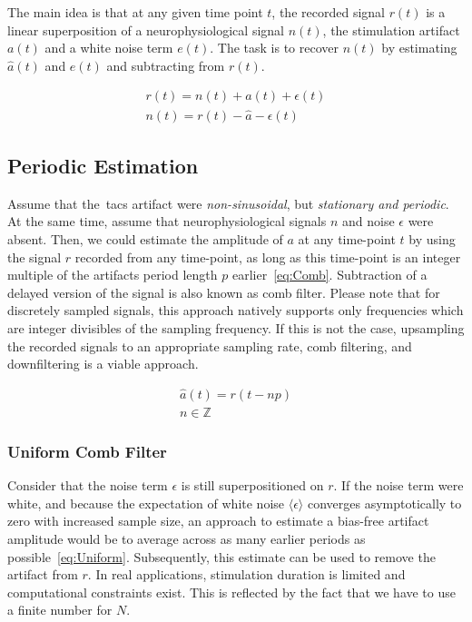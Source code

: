 \documentclass[a4paper]{article}
\begin{document}
The main idea is that at any given time point $t$, the recorded signal $r(t)$ is a linear super\-position of a neurophysiological signal $n(t)$, the stimulation artifact $a(t)$ and a white noise term $e(t)$. The task is to recover $n(t)$ by estimating $\hat{a}(t)$ and $e(t)$ and subtracting from $r(t)$.

\begin{eqnarray}
    r(t) = n(t) + a(t) + \epsilon(t)\\
    n(t) = r(t) - \hat{a} - \epsilon(t)
\end{eqnarray}

\subsection{Periodic Estimation}
Assume that the~\gls{tacs} artifact were \emph{non-sinusoidal}, but \emph{stationary and periodic}. At the same time, assume that neurophysiological signals $n$ and noise $\epsilon$ were absent.
Then, we could estimate the amplitude of $a$ at any time-point $t$ by using the signal $r$ recorded from any time-point, as long as this time-point is an integer multiple of the artifacts period length $p$ earlier~\eqref{eq:Comb}.
Subtraction of a delayed version of the signal is also known as comb filter. Please note that for discretely sampled signals, this approach natively supports only frequencies which are integer divisibles of the sampling frequency. If this is not the case, upsampling the recorded signals to an appropriate sampling rate, comb filtering, and downfiltering is a viable approach.

\begin{eqnarray}
    \hat{a}(t) = r(t-np)\label{eq:Comb}\\
    n \in \mathbb{Z}
\end{eqnarray}

\subsubsection{Uniform Comb Filter}

Consider that the noise term $\epsilon$ is still superpositioned on $r$. If the noise term were white, and because the expectation of white noise $\langle\epsilon\rangle$ converges asymptotically to zero with increased sample size, an approach to estimate a bias-free  artifact amplitude would be to average across as many earlier periods as possible~\eqref{eq:Uniform}.
Subsequently, this estimate can be used to  remove the artifact from $r$.
In real applications, stimulation duration is limited and computational constraints exist. This is reflected by the fact that we have to use a finite number for $N$.
\end{document}
